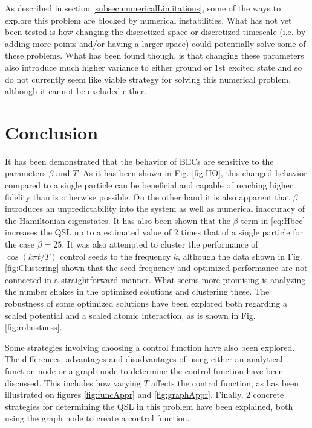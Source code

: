 \documentclass[a4paper, twocolumn]{revtex4-1}
\begin{document}
As described in section \ref{subsec:numericalLimitations}, some of the ways to explore this problem are blocked by numerical instabilities. What has not yet been tested is how changing the discretized space or discretized timescale (i.e. by adding more points and/or having a larger space) could potentially solve some of these problems. What has been found though, is that changing these parameters also introduce much higher variance to either ground or 1st excited state and so do not currently seem like viable strategy for solving this numerical problem, although it cannot be excluded either.


\section{Conclusion}\label{sec:conclusion}
It has been demonstrated that the behavior of BECs are sensitive to the parameters $\beta$ and $T$. As it has been shown in Fig. \ref{fig:HO}, this changed behavior compared to a single particle can be beneficial and capable of reaching higher fidelity than is otherwise possible. On the other hand it is also apparent that $\beta$ introduces an unpredictability into the system as well as numerical inaccuracy of the Hamiltonian eigenstates. It has also been shown that the $\beta$ term in \eqref{eq:Hbec} increases the QSL up to a estimated value of 2 times that of a single particle for the case $\beta=25$. It was also attempted to cluster the performance of $\cos(k\pi t/T)$ control seeds to the frequency $k$, although the data shown in Fig. \ref{fig:Clustering} shown that the seed frequency and optimized performance are not connected in a straightforward manner. What seems more promising is analyzing the number shakes in the optimized solutions and clustering these. The robustness of some optimized solutions have been explored both regarding a scaled potential and a scaled atomic interaction, as is shown in Fig. \ref{fig:robustness}.

Some strategies involving choosing a control function have also been explored. The differences, advantages and disadvantages of using either an analytical function node or a graph node to determine the control function have been discussed. This includes how varying $T$ affects the control function, as has been illustrated on figures \ref{fig:funcAppr} and \ref{fig:graphAppr}. Finally, 2 concrete strategies for determining the QSL in this problem have been explained, both using the graph node to create a control function.
\end{document}
